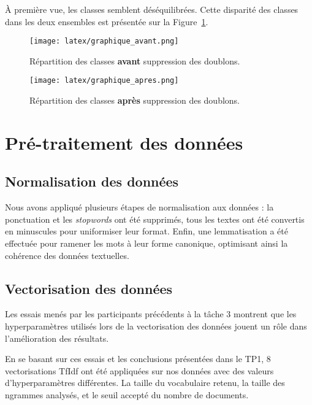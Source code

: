 \documentclass[11pt]{article}
\begin{document}

À première vue, les classes semblent déséquilibrées. Cette disparité des classes dans les deux ensembles est présentée sur la Figure~\ref{fig:graph_avant}.

\begin{figure}[H]
  \texttt{[image: latex/graphique\_avant.png]}
  \caption{Répartition des classes \textbf{avant} suppression des doublons.}
  \label{fig:graph_avant} %
\end{figure}



\begin{figure}[H]
  \texttt{[image: latex/graphique\_apres.png]}
  \caption{Répartition des classes \textbf{après} suppression des doublons.}
  \label{fig:graph_apres} %
\end{figure}


\section{Pré-traitement des données}
\subsection{Normalisation des données}
Nous avons appliqué plusieurs étapes de normalisation aux données : la ponctuation et les \textit{stopwords} ont été supprimés, tous les textes ont été convertis en minuscules pour uniformiser leur format. Enfin, une lemmatisation a été effectuée pour ramener les mots à leur forme canonique, optimisant ainsi la cohérence des données textuelles.

\subsection{Vectorisation des données}
Les essais menés par les participants précédents à la tâche 3 montrent que les hyperparamètres utilisés lors de la vectorisation des données jouent un rôle dans l'amélioration des résultats.

En se basant sur ces essais et les conclusions présentées dans le TP1\cite{TP1}, 8 vectorisations TfIdf ont été appliquées sur nos données avec des valeurs d'hyperparamètres différentes. La taille du vocabulaire retenu, la taille des ngrammes analysés, et le seuil accepté du nombre de documents. 
\end{document}
